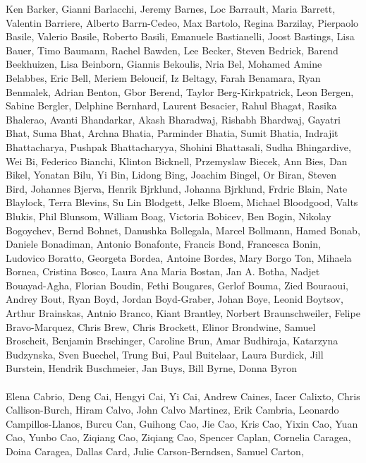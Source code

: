 \documentclass[11pt]{article}
\begin{document}
\begin{description}[itemsep=4mm, style=nextline]
Ken Barker, 
Gianni Barlacchi, 
Jeremy Barnes, 
Loc Barrault, 
Maria Barrett, 
Valentin Barriere, 
Alberto Barrn-Cedeo, 
Max Bartolo, 
Regina Barzilay, 
Pierpaolo Basile, 
Valerio Basile, 
Roberto Basili, 
Emanuele Bastianelli, 
Joost Bastings, 
Lisa Bauer, 
Timo Baumann, 
Rachel Bawden, 
Lee Becker, 
Steven Bedrick, 
Barend Beekhuizen, 
Lisa Beinborn, 
Giannis Bekoulis, 
Nria Bel, 
Mohamed Amine Belabbes, 
Eric Bell, 
Meriem Beloucif, 
Iz Beltagy, 
Farah Benamara, 
Ryan Benmalek, 
Adrian Benton, 
Gbor Berend, 
Taylor Berg-Kirkpatrick, 
Leon Bergen, 
Sabine Bergler, 
Delphine Bernhard, 
Laurent Besacier, 
Rahul Bhagat, 
Rasika Bhalerao, 
Avanti Bhandarkar, 
Akash Bharadwaj, 
Rishabh Bhardwaj, 
Gayatri Bhat, 
Suma Bhat, 
Archna Bhatia, 
Parminder Bhatia, 
Sumit Bhatia, 
Indrajit Bhattacharya, 
Pushpak Bhattacharyya, 
Shohini Bhattasali, 
Sudha Bhingardive, 
Wei Bi, 
Federico Bianchi, 
Klinton Bicknell, 
Przemyslaw Biecek, 
Ann Bies, 
Dan Bikel, 
Yonatan Bilu, 
Yi Bin, 
Lidong Bing, 
Joachim Bingel, 
Or Biran, 
Steven Bird, 
Johannes Bjerva, 
Henrik Bjrklund, 
Johanna Bjrklund, 
Frdric Blain, 
Nate Blaylock, 
Terra Blevins, 
Su Lin Blodgett, 
Jelke Bloem, 
Michael Bloodgood, 
Valts Blukis, 
Phil Blunsom, 
William Boag, 
Victoria Bobicev, 
Ben Bogin, 
Nikolay Bogoychev, 
Bernd Bohnet, 
Danushka Bollegala, 
Marcel Bollmann, 
Hamed Bonab, 
Daniele Bonadiman, 
Antonio Bonafonte, 
Francis Bond, 
Francesca Bonin, 
Ludovico Boratto, 
Georgeta Bordea, 
Antoine Bordes, 
Mary Borgo Ton, 
Mihaela Bornea, 
Cristina Bosco, 
Laura Ana Maria Bostan, 
Jan A. Botha, 
Nadjet Bouayad-Agha, 
Florian Boudin, 
Fethi Bougares, 
Gerlof Bouma, 
Zied Bouraoui, 
Andrey Bout, 
Ryan Boyd, 
Jordan Boyd-Graber, 
Johan Boye, 
Leonid Boytsov, 
Arthur Brainskas, 
Antnio Branco, 
Kiant Brantley, 
Norbert Braunschweiler, 
Felipe Bravo-Marquez, 
Chris Brew, 
Chris Brockett, 
Elinor Brondwine, 
Samuel Broscheit, 
Benjamin Brschinger, 
Caroline Brun, 
Amar Budhiraja, 
Katarzyna Budzynska, 
Sven Buechel, 
Trung Bui, 
Paul Buitelaar, 
Laura Burdick, 
Jill Burstein, 
Hendrik Buschmeier, 
Jan Buys, 
Bill Byrne, 
Donna Byron
\\
\\
Elena Cabrio, 
Deng Cai, 
Hengyi Cai, 
Yi Cai, 
Andrew Caines, 
Iacer Calixto, 
Chris Callison-Burch, 
Hiram Calvo, 
John Calvo Martinez, 
Erik Cambria, 
Leonardo Campillos-Llanos, 
Burcu Can, 
Guihong Cao, 
Jie Cao, 
Kris Cao, 
Yixin Cao, 
Yuan Cao, 
Yunbo Cao, 
Ziqiang Cao, 
Ziqiang Cao, 
Spencer Caplan, 
Cornelia Caragea, 
Doina Caragea, 
Dallas Card, 
Julie Carson-Berndsen, 
Samuel Carton, 

\end{description}
\end{document}
